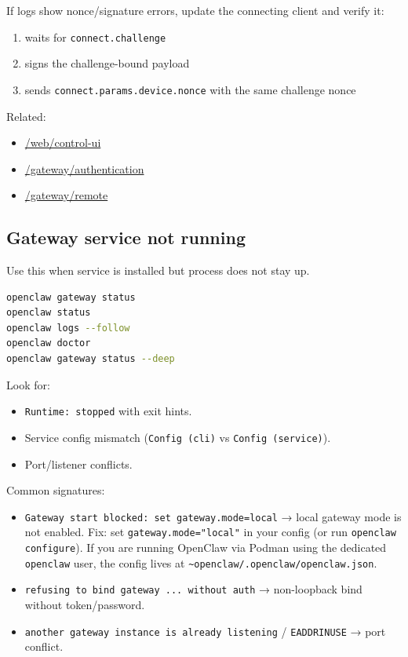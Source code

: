 If logs show nonce/signature errors, update the connecting client and verify it:

\begin{enumerate}
  \item waits for \texttt{connect.challenge}
  \item signs the challenge-bound payload
  \item sends \texttt{connect.params.device.nonce} with the same challenge nonce
\end{enumerate}


Related:

\begin{itemize}
  \item \href{/web/control-ui}{/web/control-ui}
  \item \href{/gateway/authentication}{/gateway/authentication}
  \item \href{/gateway/remote}{/gateway/remote}
\end{itemize}


\subsection{Gateway service not running}


Use this when service is installed but process does not stay up.

\begin{lstlisting}[language=bash]
openclaw gateway status
openclaw status
openclaw logs --follow
openclaw doctor
openclaw gateway status --deep
\end{lstlisting}


Look for:

\begin{itemize}
  \item \texttt{Runtime: stopped} with exit hints.
  \item Service config mismatch (\texttt{Config (cli)} vs \texttt{Config (service)}).
  \item Port/listener conflicts.
\end{itemize}


Common signatures:

\begin{itemize}
  \item \texttt{Gateway start blocked: set gateway.mode=local} → local gateway mode is not enabled. Fix: set \texttt{gateway.mode="local"} in your config (or run \texttt{openclaw configure}). If you are running OpenClaw via Podman using the dedicated \texttt{openclaw} user, the config lives at \texttt{\textasciitilde{}openclaw/.openclaw/openclaw.json}.
  \item \texttt{refusing to bind gateway ... without auth} → non-loopback bind without token/password.
  \item \texttt{another gateway instance is already listening} / \texttt{EADDRINUSE} → port conflict.
\end{itemize}


